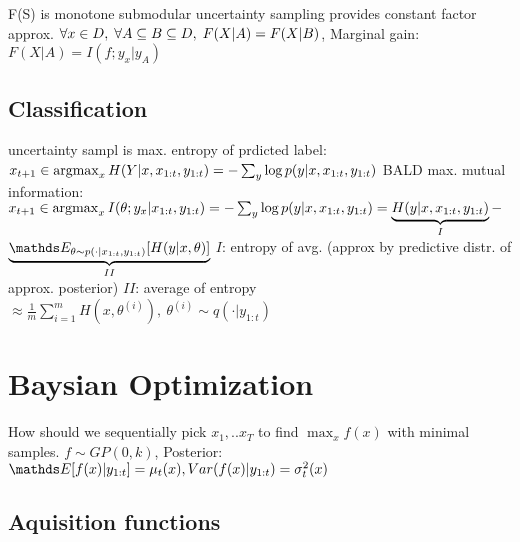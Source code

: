 F(S) is monotone submodular \textrightarrow uncertainty sampling provides constant factor approx.
$\Forall {x \in D} \Forall {A \subseteq B \subseteq D} F(X|A) = F(X|B)$,
Marginal gain: $F(X|A)= I(f; y_{x} | y_{A})$

\subsection{Classification}
uncertainty sampl is max. entropy of prdicted label: $x_{t+1} \in \operatorname*{argmax}_{x}H(Y|x,x_{1:t}, y_{1:t})
= - \sum_{y} \log p(y|x, x_{1:t}, y_{1:t})$
BALD max. mutual information: $x_{t+1} \in \operatorname*{argmax}_{x}I(\theta; y_{x}|x_{1:t}, y_{1:t})
= - \sum_{y} \log p(y|x, x_{1:t}, y_{1:t}) = \underbrace{H(y|x, x_{1:t}, y_{1:t})}_{I} - $
$\underbrace{\E[\theta \sim p(\cdot|x_{1:t}, y_{1:t})]{H(y|x, \theta)}}_{II}$
$I$: entropy of avg. (approx by predictive distr. of approx. posterior)
$II$: average of entropy $\approx \frac{1}{m} \sum_{i=1}^{m}H(x, \theta^{(i)}),\ \theta^{(i)}\sim q(\cdot|y_{1:t})$

\section{Baysian Optimization}
How should we sequentially pick $x_{1},..x_{T}$ to find $\max_{x}f(x)$ with minimal samples.
$f \sim GP(0,k)$, Posterior: $\E{f(x)|y_{1:t}}=\mu_{t}(x), Var(f(x)|y_{1:t})=\sigma_{t}^2(x)$
\subsection{Aquisition functions}
\begin{itemize}
\end{itemize}




